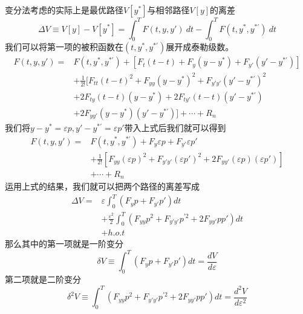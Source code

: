 \documentclass[UTF8,12pt]{ctexart}
\numberwithin{equation}{section} %
\numberwithin{figure}{section}
\numberwithin{table}{section}
\begin{document}
	变分法考虑的实际上是最优路径$V[y^*]$与相邻路径$V[y]$的离差
	\begin{equation}
		\Delta V \equiv V[y] - V[y^*] = \int_{0}^{T}F(t,y,y') \ dt - \int_{0}^{T}F(t,y^*,y^{*'}) \ dt
	\end{equation}
	我们可以将第一项的被积函数在$(t,y^*,y^{*'})$展开成泰勒级数。
	\begin{equation}
		\begin{aligned}
			F(t,y,y')=
			&F(t,y^*,y^{*'}) + [F_{t}(t-t) + F_{y}(y-y^*) + F_{y'}(y' - y^{*'})] \\
			&+\frac{1}{2!}[F_{tt}(t-t)^2 + F_{yy}(y - y^*)^2 + F_{y'y'}(y' - y^{*'})^2 \\
			&+2F_{ty}(t - t)(y - y^*) + 2F_{ty'}(t - t)(y' - y^{*'})\\
			&+2F_{yy'}(y - y^*)(y' - y^{*'})] + \cdots + R_n
		\end{aligned}
	\end{equation}
	我们将$y - y^* = \varepsilon p,y' - y^{*'} = \varepsilon p'$带入上式后我们就可以得到
	\begin{equation}
		\begin{aligned}
			F(t,y,y')=
			&F(t,y^*,y^{*'}) + F_{y}\varepsilon p + F_{y'}\varepsilon p' \\
			&+\frac{1}{2!}[ F_{yy}(\varepsilon p)^2 + F_{y'y'}(\varepsilon p')^2 +2F_{yy'}(\varepsilon p)(\varepsilon p')] \\
			& + \cdots + R_n
		\end{aligned}
	\end{equation}
	运用上式的结果，我们就可以把两个路径的离差写成
	\begin{equation}
		\begin{aligned}
			\Delta V = 
			&\varepsilon \int_{0}^{T}(F_yp+F_{y'}p')dt \\
			&+\frac{\varepsilon^2}{2}\int_{0}^{T}(F_{yy}p^2 + F_{y'y'}p^{'2} + 2F_{yy'}pp')dt \\
			&+h.o.t
		\end{aligned}
	\end{equation}
	那么其中的第一项就是一阶变分
	\begin{equation}
		\delta V \equiv \int_{0}^{T}(F_yp+F_{y'}p')dt = \frac{dV}{d\varepsilon}
	\end{equation}
	第二项就是二阶变分
	\begin{equation}
		\delta^2V \equiv \int_{0}^{T}(F_{yy}p^2 + F_{y'y'}p^{'2} + 2F_{yy'}pp')dt = \frac{d^2V}{d\varepsilon^2}
	\end{equation}
	
	
	\newpage
	
\end{document}
